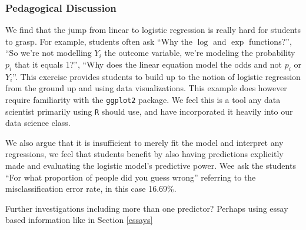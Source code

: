 \documentclass{article}\usepackage[]{graphicx}\usepackage[]{color}
\begin{document}
\subsubsection{Pedagogical Discussion}
We find that the jump from linear to logistic regression is really hard for students to grasp.  For example, students often ask ``Why the $\log$ and $\exp$ functions?'', ``So we're not modelling $Y_i$ the outcome variable, we're modeling the probability $p_i$ that it equals 1?'', ``Why does the linear equation model the odds and not $p_i$ or $Y_i$''.  This exercise provides students to build up to the notion of logistic regression from the ground up and using data visualizations.  This example does however require familiarity with the \verb#ggplot2# package.  We feel this is a tool any data scientist primarily using \verb#R# should use, and have incorporated it heavily into our data science class.  

We also argue that it is insufficient to merely fit the model and interpret any regressions, we feel that students benefit by also having predictions explicitly made and evaluating the logistic model's predictive power.  Wee ask the students ``For what proportion of people did you guess wrong'' referring to the misclassification error rate, in this case 16.69\%.  

Further investigations including more than one predictor?  Perhaps using essay based information like in Section \ref{essays}












%
\end{document}

